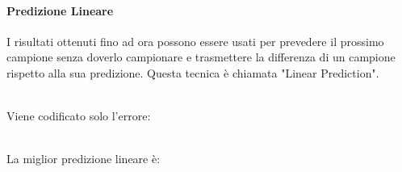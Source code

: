 \documentclass{article}
\begin{document}
				\paragraph{Predizione Lineare}
					I risultati ottenuti fino ad ora possono essere usati per prevedere il prossimo campione senza doverlo campionare e trasmettere la differenza di un campione rispetto alla sua predizione. Questa tecnica è chiamata "Linear Prediction".
					\begin{figure}[ht!]
					\end{figure}
					\\Viene codificato solo l'errore:
					\begin{figure}[ht!]
					\end{figure}
					\\La miglior predizione lineare è:
					\begin{figure}[ht!]
					\end{figure}
\end{document}
